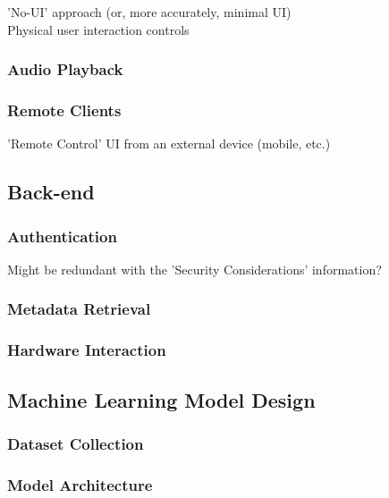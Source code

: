             'No-UI' approach (or, more accurately, minimal UI)\\
            Physical user interaction controls

        \subsubsection{Audio Playback}

        \subsubsection{Remote Clients}
            'Remote Control' UI from an external device (mobile, etc.)
	
	\subsection{Back-end}
        \subsubsection{Authentication}
            Might be redundant with the 'Security Considerations' information?

        \subsubsection{Metadata Retrieval}
        
        \subsubsection{Hardware Interaction}
	
	\subsection{Machine Learning Model Design}
        \subsubsection{Dataset Collection}

        \subsubsection{Model Architecture}


